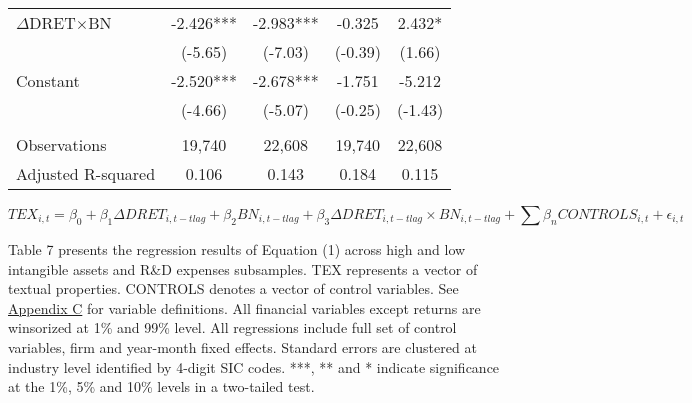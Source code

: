 \begin{table}[H]
\begin{center}
\begin{tabular}{lcccc}
			\rowcolor[rgb]{ .906,  .902,  .902} $\Delta$DRET$\times$BN & -2.426*** & -2.983*** & -0.325 & 2.432* \\
			\rowcolor[rgb]{ .906,  .902,  .902} & (-5.65) & (-7.03) & (-0.39) & (1.66) \\
			Constant & -2.520*** & -2.678*** & -1.751 & -5.212 \\
			& (-4.66) & (-5.07) & (-0.25) & (-1.43) \\
			&   &   &   &  \\
			Observations & 19,740 & 22,608 & 19,740 & 22,608 \\
			Adjusted R-squared & 0.106 & 0.143 & 0.184 & 0.115 \\
			\bottomrule
			\bottomrule
		\end{tabular}%
	\end{center}
		\begin{footnotesize}
			\setcounter{equation}{0}
			\begin{equation}
				TEX_{i,t}=\beta_0+\beta_1\Delta DRET_{i,t-tlag}+\beta_2BN_{i,t-tlag}+\beta_3\Delta DRET_{i,t-tlag}\times 		BN_{i,t-tlag}+\sum\beta_nCONTROLS_{i,t}+\epsilon_{i,t}
			\end{equation}
			
			\noindent Table 7 presents the regression results of Equation (1) across high and low intangible assets and R\&D expenses subsamples. TEX represents a vector of textual properties. CONTROLS denotes a vector of control variables. See \hyperref[appc]{Appendix C} for variable definitions. All financial variables except returns are winsorized at 1\% and 99\% level. All regressions include full set of control variables, firm and year-month fixed effects. Standard errors are clustered at industry level identified by 4-digit SIC codes. ***, ** and * indicate significance at the 1\%, 5\% and 10\% levels in a two-tailed test.
		\end{footnotesize}
\end{table}%